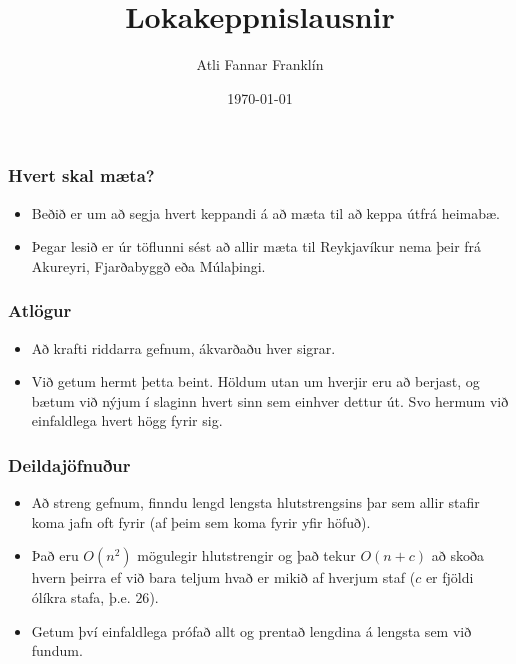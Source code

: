 \documentclass{beamer}
\title{Lokakeppnislausnir}
\author{Atli Fannar Franklín}
\date{\today}
\begin{document}
\frame{\titlepage}

\begin{frame}
\frametitle{Hvert skal mæta?}

\begin{itemize}

\item Beðið er um að segja hvert keppandi á að mæta til að keppa útfrá heimabæ.

\vspace*{0.5cm}

\item Þegar lesið er úr töflunni sést að allir mæta til Reykjavíkur nema þeir frá Akureyri, Fjarðabyggð eða Múlaþingi.

\end{itemize}

\end{frame}

\begin{frame}
\frametitle{Atlögur}

\begin{itemize}

\item Að krafti riddarra gefnum, ákvarðaðu hver sigrar.

\vspace*{0.5cm}

\item Við getum hermt þetta beint. Höldum utan um hverjir eru að berjast, og bætum við nýjum í slaginn hvert sinn sem einhver dettur út. Svo hermum við einfaldlega hvert högg fyrir sig.

\end{itemize}

\end{frame}

\begin{frame}
\frametitle{Deildajöfnuður}

\begin{itemize}

\item Að streng gefnum, finndu lengd lengsta hlutstrengsins þar sem allir stafir koma jafn oft fyrir (af þeim sem koma fyrir yfir höfuð).

\vspace*{0.25cm}

\item Það eru $O(n^2)$ mögulegir hlutstrengir og það tekur $O(n + c)$ að skoða hvern þeirra ef við bara teljum hvað er mikið af hverjum staf ($c$ er fjöldi ólíkra stafa, þ.e. $26$).

\vspace*{0.25cm}

\item Getum því einfaldlega prófað allt og prentað lengdina á lengsta sem við fundum.

\end{itemize}

\end{frame}
\end{document}
